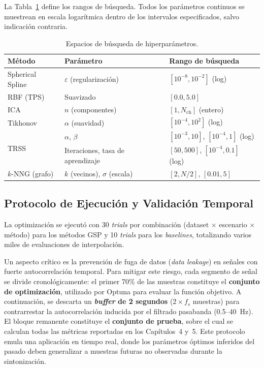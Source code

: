 La Tabla~\ref{tab:hyperparams} define los rangos de búsqueda. Todos los parámetros continuos se muestrean en escala logarítmica dentro de los intervalos especificados, salvo indicación contraria.

\begin{table}[ht]
\centering
\caption{Espacios de búsqueda de hiperparámetros.}
\label{tab:hyperparams}
\begin{tabular}{lll}
\toprule
\textbf{Método} & \textbf{Parámetro} & \textbf{Rango de búsqueda} \\
\midrule
Spherical Spline   & $\varepsilon$ (regularización) & $[10^{-8}, 10^{-2}]$ (log) \\
RBF (TPS)          & Suavizado                     & $[0.0, 5.0]$ \\
ICA                & $n$ (componentes)             & $[1, N_{\text{ch}}]$ (entero) \\
\midrule
Tikhonov           & $\alpha$ (suavidad)           & $[10^{-4}, 10^{2}]$ (log) \\
\midrule
\multirow{2}{*}{TRSS} & $\alpha$, $\beta$          & $[10^{-3}, 10]$, $[10^{-4}, 1]$ (log) \\
                     & Iteraciones, tasa de aprendizaje & $[50, 500]$, $[10^{-4}, 0.1]$ (log) \\
\midrule
$k$-NNG (grafo)    & $k$ (vecinos), $\sigma$ (escala) & $[2, N/2]$, $[0.01, 5]$ \\
\bottomrule
\end{tabular}
\end{table}

\subsection{Protocolo de Ejecución y Validación Temporal}

La optimización se ejecutó con 30 \textit{trials} por combinación (dataset $\times$ escenario $\times$ método) para los métodos GSP y 10 \textit{trials} para los \textit{baselines}, totalizando varios miles de evaluaciones de interpolación.

Un aspecto crítico es la prevención de fuga de datos (\textit{data leakage}) en señales con fuerte autocorrelación temporal. Para mitigar este riesgo, cada segmento de señal se divide cronológicamente: el primer 70\% de las muestras constituye el \textbf{conjunto de optimización}, utilizado por Optuna para evaluar la función objetivo. A continuación, se descarta un \textbf{\textit{buffer} de 2 segundos} ($2 \times f_s$ muestras) para contrarrestar la autocorrelación inducida por el filtrado pasabanda (0.5--40~Hz). El bloque remanente constituye el \textbf{conjunto de prueba}, sobre el cual se calculan todas las métricas reportadas en los Capítulos~4 y~5. Este protocolo emula una aplicación en tiempo real, donde los parámetros óptimos inferidos del pasado deben generalizar a muestras futuras no observadas durante la sintonización.

